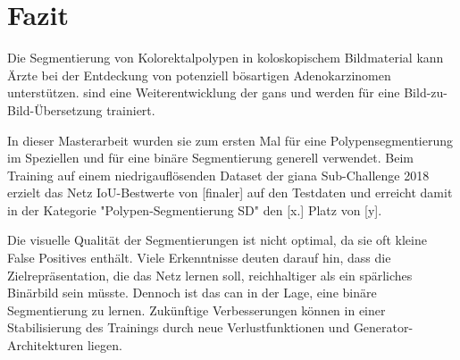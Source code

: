 \chapter{Fazit}

Die Segmentierung von Kolorektalpolypen in koloskopischem Bildmaterial kann Ärzte bei der Entdeckung von potenziell bösartigen Adenokarzinomen unterstützen.
 sind eine Weiterentwicklung der \glspl{gan} und werden für eine Bild-zu-Bild-Übersetzung trainiert.

In dieser Masterarbeit wurden sie zum ersten Mal für eine Polypensegmentierung im Speziellen und für eine binäre Segmentierung generell verwendet.
Beim Training auf einem niedrigauflösenden Dataset der \gls{giana} Sub-Challenge 2018 erzielt das Netz IoU-Bestwerte von [finaler] auf den Testdaten und erreicht damit in der Kategorie "Polypen-Segmentierung SD" den [x.] Platz von [y].

Die visuelle Qualität der Segmentierungen ist nicht optimal, da sie oft kleine False Positives enthält.
Viele Erkenntnisse deuten darauf hin, dass die Zielrepräsentation, die das Netz lernen soll, reichhaltiger als ein spärliches Binärbild sein müsste.
Dennoch ist das \gls{can} in der Lage, eine binäre Segmentierung zu lernen.
Zukünftige Verbesserungen können in einer Stabilisierung des Trainings durch neue Verlustfunktionen und Generator-Architekturen liegen.
